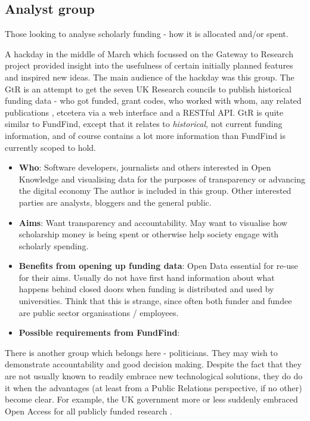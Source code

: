 \subsection{Analyst group}
\label{audience-analyst}
Those looking to analyse scholarly funding - how it is allocated and/or spent.

A hackday in the middle of March which focussed on the Gateway to Research project provided insight into the usefulness of certain initially planned features and inspired new ideas. The main audience of the hackday was this group. The GtR is an attempt to get the seven UK Research councils to publish historical funding data - who got funded, grant codes, who worked with whom, any related publications \cite{gtr}, etcetera via a web interface and a RESTful API. GtR is quite similar to FundFind, except that it relates to \emph{historical}, not current funding information, and of course contains a lot more information than FundFind is currently scoped to hold.

\begin{itemize}
 \item \textbf{Who}: Software developers, journalists and others interested in Open Knowledge and visualising data for the purposes of transparency or advancing the digital economy \cite{okfn-vision} The author is included in this group. Other interested parties are analysts, bloggers and the general public.
 \item \textbf{Aims}: Want transparency and accountability. May want to visualise how scholarship money is being spent or otherwise help society engage with scholarly spending.
 \item \textbf{Benefits from opening up funding data}: Open Data essential for re-use for their aims. Usually do not have first hand information about what happens behind closed doors when funding is distributed and used by universities. Think that this is strange, since often both funder and fundee are public sector organisations / employees.
 \item \textbf{Possible requirements from FundFind}: 
\end{itemize}

There is another group which belongs here - politicians. They may wish to demonstrate accountability and good decision making. Despite the fact that they are not usually known to readily embrace new technological solutions, they do do it when the advantages (at least from a Public Relations perspective, if no other) become clear. For example, the UK government more or less suddenly embraced Open Access for all publicly funded research \cite{guardian-ukgov-oa2014}.

